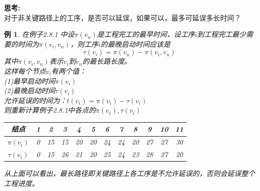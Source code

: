 \documentclass[11pt,a4paper,openany]{book}
\newtheorem{sample}{\textbf{例}}[section]
\begin{document}
\textbf{思考:}\\
对于非关键路径上的工序，是否可以延误，如果可以，最多可延误多长时间？\\
\begin{sample}
在例子2.8.1 中设$\pi(v_n)$是工程完工的最早时间，设工序$i$到工程完工最少需要的时间为$\pi(v_i,v_n)$，则工序$i$的最晚启动时间应该是\\
\begin{equation}
    \tau(v_i)=\pi(v_n)-\pi(v_i,v_n)
\end{equation}
其中$\pi(v_i,v_n)$表示$v_i$到$v_n$的最长路长度。\\
 这样每个节点$v_i$有两个值：\\
(1)最早启动时间$\pi(v_i)$\\
(2)最晚启动时间$\tau(v_i)$\\
 允许延误的时间为：$t(v_i)=\pi(v_i)-\tau(v_i)$\\
则重新计算例子2.8.1中各点的$\pi(v_i),\tau(v_i)$\\
\begin{table}[H]
  \centering
\begin{tabular}{|c|c|c|c|c|c|c|c|c|c|c|c|}
  \hline
   结点& 1& 2 & 3 &4 & 5 & 6 & 7& 8 & 9 & 10 & 11 \\
   \hline
  $\pi(v_i)$ & 0 & 15 & 15 & 20 & 20 & 24 & 24 & 20 & 27 & 27 & 30 \\
  \hline
  $\tau(v_i)$ & 0 & 15 & 26 & 21 & 20 & 25 & 24 & 23 & 28 & 27 & 20 \\
  \hline
\end{tabular}
\end{table}
从上面可以看出，最长路径即关键路径上各工序是不允许延误的，否则会延误整个工程进度。\\
\end{sample}
\end{document}
